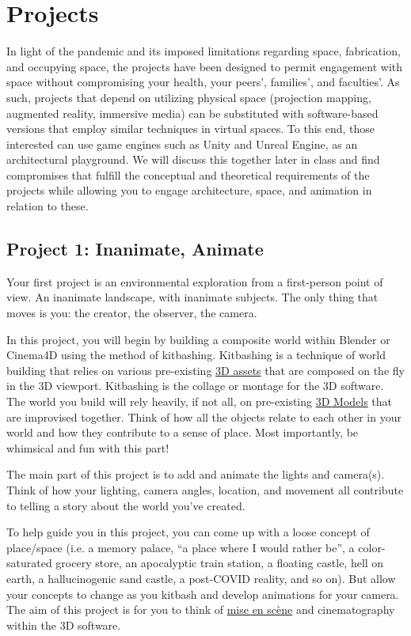 \section{Projects}

In light of the pandemic and its imposed limitations regarding space, fabrication, and occupying space, the projects have been designed to permit engagement with space without compromising your health, your peers', families', and faculties'. As such, projects that depend on utilizing physical space (projection mapping, augmented reality, immersive media) can be substituted with software-based versions that employ similar techniques in virtual spaces. To this end, those interested can use game engines such as Unity and Unreal Engine, as an architectural playground. We will discuss this together later in class and find compromises that fulfill the conceptual and theoretical requirements of the projects while allowing you to engage architecture, space, and animation in relation to these.

\subsection{Project 1: Inanimate, Animate}
Your first project is an environmental exploration from a first-person point of view. An inanimate landscape, with inanimate subjects. The only thing that moves is you: the creator, the observer, the camera.

In this project, you will begin by building a composite world within Blender or Cinema4D using the method of kitbashing. Kitbashing is a technique of world building that relies on various pre-existing \hyperlink{rsrc:models}{3D assets} that are composed on the fly in the 3D viewport. Kitbashing is the collage or montage for the 3D software. The world you build will rely heavily, if not all, on pre-existing \hyperlink{rsrc:models}{3D Models} that are improvised together. Think of how all the objects relate to each other in your world and how they contribute to a sense of place. Most importantly, be whimsical and fun with this part!

The main part of this project is to add and animate the lights and camera(s). Think of how your lighting, camera angles, location, and movement all contribute to telling a story about the world you've created.

To help guide you in this project, you can come up with a loose concept of place/space (i.e. a memory palace, ``a place where I would rather be'', a color-saturated grocery store, an apocalyptic train station, a floating castle, hell on earth, a hallucinogenic sand castle, a post-COVID reality, and so on). But allow your concepts to change as you kitbash and develop animations for your camera. The aim of this project is for you to think of \href{https://en.wikipedia.org/wiki/Mise-en-sc\%C3\%A8ne}{mise en scène} and cinematography within the 3D software.

